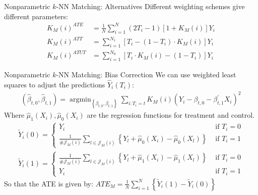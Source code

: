 \documentclass[xcolor=pdftex,dvipsnames,table,mathserif,aspectratio=169]{beamer}
\begin{document}
\begin{frame}{Nonparametric $k$-NN Matching: Alternatives}
Different weighting schemes give different parameters:
\begin{align*}
K_{M}(i)^{ATE}&=\frac{1}{N} \sum_{i=1}^{N} \left(2 T_{i}-1\right)\left[1+K_{M}(i)\right] Y_{i} \\
K_{M}(i)^{ATT}&=\sum_{i=1}^{N_1} \left[T_{i}-(1-T_i) \cdot K_{M}(i)\right] Y_{i}\\
K_{M}(i)^{ATUT}&=\sum_{i=1}^{N_0} \left[T_{i}\cdot K_{M}(i) -(1-T_i) \right] Y_{i}
\end{align*}
\end{frame}


\begin{frame}{Nonparametric $k$-NN Matching: Bias Correction}
We can use weighted least squares to adjust the predictions $\hat{Y}_i(T_i)$:
\begin{align*}
\left(\widehat{\beta}_{t, 0}, \widehat{\beta}_{t, 1}\right)=\operatorname{argmin}_{\left\{\beta_{t, 0}, \beta_{t, 1}\right\}} \sum_{i: T_{i}=t} K_{M}(i)\left(Y_{i}-\beta_{t, 0}-\beta_{t, 1}^{\prime} X_{i}\right)^{2}
\end{align*}
Where $\widehat{\mu}_1(X_i),\widehat{\mu}_0(X_i)$ are the regression functions for treatment and control.
\begin{align*}
\tilde{Y}_{i}(0)=\left\{\begin{array}{cc}
Y_{i} & \text { if } T_{i}=0 \\
\frac{1}{\# \mathcal{J}_{M}(i)} \sum_{l \in \mathcal{J}_{M}(i)}\left\{Y_{l}+\widehat{\mu}_{0}\left(X_{i}\right)-\widehat{\mu}_{0}\left(X_{l}\right)\right\} & \text { if } T_{i}=1
\end{array}\right. \\
\tilde{Y}_{i}(1)=\left\{\begin{array}{cc}
\frac{1}{\# \mathcal{J}_{M}(i)} \sum_{l \in \mathcal{J}_{M}(i)}\left\{Y_{l}+\widehat{\mu}_{1}\left(X_{i}\right)-\widehat{\mu}_{1}\left(X_{l}\right)\right\} & \text { if } T_{i}=0 \\
Y_{i} & \text { if } T_{i}=1
\end{array}\right.
\end{align*}
So that the ATE is given by: $ATE_M=\frac{1}{N} \sum_{i=1}^{N}\left\{\tilde{Y}_{i}(1)-\tilde{Y}_{i}(0)\right\}$
\end{frame}
\end{document}
